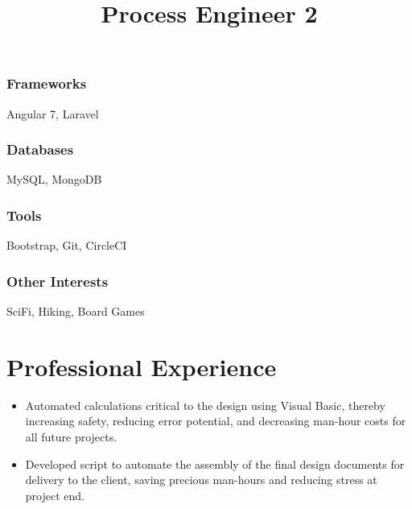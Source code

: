 \documentclass[12pt]{res} %
\begin{document}
\begin{resume}
\begin{multicols}{3}
            \subsubsection{Frameworks}
            \vspace{-22pt}
            Angular 7, Laravel
            \vspace{-28pt}

            \subsubsection{Databases}
            \vspace{-22pt}
            MySQL, MongoDB
            \vspace{-28pt}

            \subsubsection{Tools}
            \vspace{-22pt}
            Bootstrap, Git, CircleCI
            \vspace{-28pt}

            \subsubsection{Other Interests}
            \vspace{-22pt}
            SciFi, Hiking, Board Games

            \vspace{-12pt}

          \end{multicols}
        \vspace{-24pt}

      \section{Professional Experience}
        \title{\textbf{Process Engineer 2}}
        \begin{position}
          \vspace{-14pt}
          \begin{itemize}[leftmargin=-0.4cm]
          \itemsep0em
          \item Automated calculations critical to the design using Visual Basic, thereby increasing safety, reducing error potential, and decreasing man-hour costs for all future projects.
          \item Developed script to automate the assembly of the final design documents for delivery to the client, saving precious man-hours and reducing stress at project end.
          \end{itemize}
        \end{position}
        \vspace{-10pt}


\end{resume}
\end{document}
